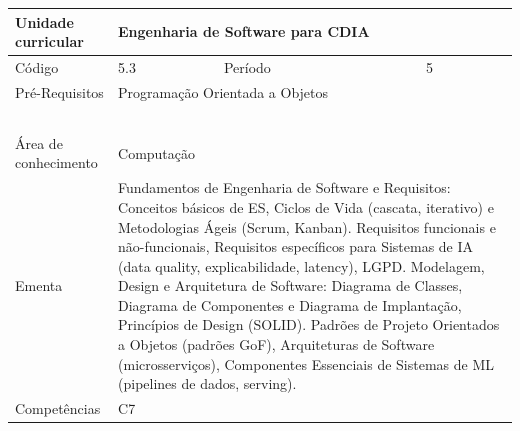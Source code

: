 \clearpage
\newpage

\begin{quadro}[ht!]
  \centering\scriptsize
\caption{Unidade Curricular Engenharia de Software para CDIA}

\begin{tabular}{|p{2.5cm}|p{2.5cm}|p{2.5cm}|p{2.5cm}|p{2.5cm}|}\hline

  Unidade curricular & \multicolumn{4}{p{10cm}|}{ Engenharia de Software para CDIA }\\\hline
  Código & 5.3 & Período & \multicolumn{2}{p{5cm}|}{ 5 }\\\hline
  Pré-Requisitos & \multicolumn{4}{p{10cm}|}{ Programação Orientada a Objetos } \\\hline
  \cellcolor{blue1}{ CH PRESENCIAL } &
    \cellcolor{blue1}{CH EAD Síncrona} &
    \cellcolor{blue1}{CH EAD Síncrona Mediada} &
    \cellcolor{blue1}{CH EAD Assíncrona} &
    \cellcolor{blue1}{CH APCC} \\\hline
  \cellcolor{blue1}{ 30 } &
    \cellcolor{blue1}{ 0 } &
    \cellcolor{blue1}{ 0 } &
    \cellcolor{blue1}{ 30 } &
    \cellcolor{blue1}{0} \\\hline
  \cellcolor{blue1}{ CH Teórica } &
    \cellcolor{blue1}{CH Prática} &
    \cellcolor{blue1}{CH Humanidades} &
    \cellcolor{blue1}{CH Extensão} &
    \cellcolor{blue1}{CH EAD TOTAL} \\\hline
  \cellcolor{blue1}{ 30 } &
    \cellcolor{blue1}{ 30 } &
    \cellcolor{blue1}{ 0 } &
    \cellcolor{blue1}{ 0 } &
    \cellcolor{blue1}{ 30 } \\\hline
  \cellcolor{blue1}{CARGA-HORÁRIA TOTAL} & \multicolumn{4}{p{10cm}|}{ \cellcolor{blue1}{ 60 } } \\\hline
  Área de conhecimento & \multicolumn{4}{p{10cm}|}{ Computação } \\\hline
  Ementa & \multicolumn{4}{p{10cm}|}{ Fundamentos de Engenharia de Software e Requisitos: Conceitos básicos de ES, Ciclos de Vida (cascata, iterativo) e Metodologias Ágeis (Scrum, Kanban). Requisitos funcionais e não-funcionais, Requisitos específicos para Sistemas de IA (data quality, explicabilidade, latency), LGPD. Modelagem, Design e Arquitetura de Software: Diagrama de Classes, Diagrama de Componentes e Diagrama de Implantação, Princípios de Design (SOLID). Padrões de Projeto Orientados a Objetos (padrões GoF), Arquiteturas de Software (microsserviços), Componentes Essenciais de Sistemas de ML (pipelines de dados, serving).  } \\\hline
  Competências & \multicolumn{4}{p{10cm}|}{ C7 } \\\hline


  
	\end{tabular}

\end{quadro}


